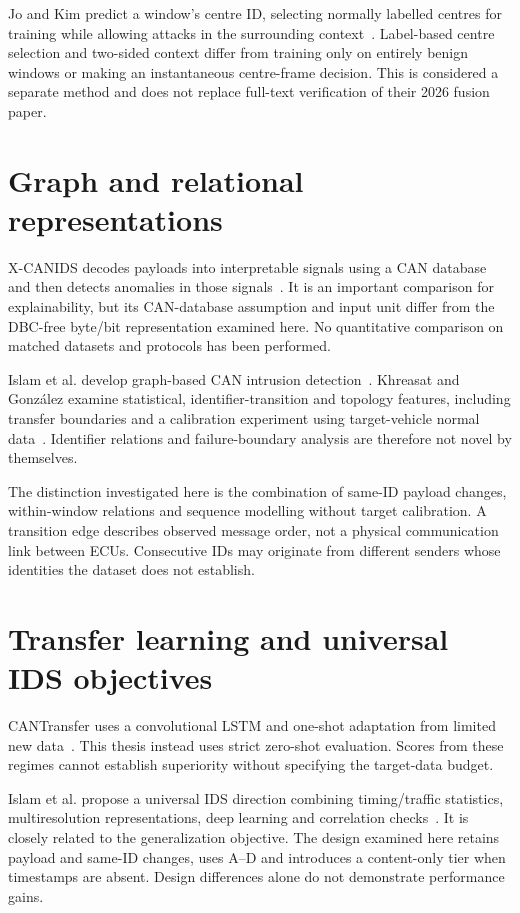 \documentclass[12pt,a4paper,oneside,openany]{extbook}
\begin{document}
Jo and Kim predict a window's centre ID, selecting normally labelled centres for training while allowing attacks in the surrounding context~\cite{jo2025indirect}. Label-based centre selection and two-sided context differ from training only on entirely benign windows or making an instantaneous centre-frame decision. This is considered a separate method and does not replace full-text verification of their 2026 fusion paper.

\section{Graph and relational representations}
X-CANIDS decodes payloads into interpretable signals using a CAN database and then detects anomalies in those signals~\cite{jeong2024xcanids}. It is an important comparison for explainability, but its CAN-database assumption and input unit differ from the DBC-free byte/bit representation examined here. No quantitative comparison on matched datasets and protocols has been performed.

Islam et al. develop graph-based CAN intrusion detection~\cite{islam2020graph}. Khreasat and González examine statistical, identifier-transition and topology features, including transfer boundaries and a calibration experiment using target-vehicle normal data~\cite{khreasat2026relational}. Identifier relations and failure-boundary analysis are therefore not novel by themselves.

The distinction investigated here is the combination of same-ID payload changes, within-window relations and sequence modelling without target calibration. A transition edge describes observed message order, not a physical communication link between ECUs. Consecutive IDs may originate from different senders whose identities the dataset does not establish.

\section{Transfer learning and universal IDS objectives}
CANTransfer uses a convolutional LSTM and one-shot adaptation from limited new data~\cite{tariq2020cantransfer}. This thesis instead uses strict zero-shot evaluation. Scores from these regimes cannot establish superiority without specifying the target-data budget.

Islam et al. propose a universal IDS direction combining timing/traffic statistics, multiresolution representations, deep learning and correlation checks~\cite{s26051489}. It is closely related to the generalization objective. The design examined here retains payload and same-ID changes, uses A--D and introduces a content-only tier when timestamps are absent. Design differences alone do not demonstrate performance gains.
\end{document}
